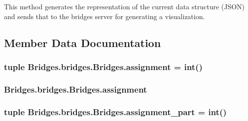 This method generates the representation of the current data structure (J\+S\+O\+N) and sends that to the bridges server for generating a visualization. 



\subsection{Member Data Documentation}
\hypertarget{class_bridges_1_1bridges_1_1_bridges_a2532355e121918d9c30c4fb19161e92e}{}
\subsubsection[{assignment}]{\setlength{\rightskip}{0pt plus 5cm}tuple Bridges.\+bridges.\+Bridges.\+assignment = int()\hspace{0.3cm}{\ttfamily [static]}}\label{class_bridges_1_1bridges_1_1_bridges_a2532355e121918d9c30c4fb19161e92e}
\hypertarget{class_bridges_1_1bridges_1_1_bridges_a66e278ddefd9a2c94c01eb0fc9bbc568}{}
\subsubsection[{assignment}]{\setlength{\rightskip}{0pt plus 5cm}Bridges.\+bridges.\+Bridges.\+assignment}\label{class_bridges_1_1bridges_1_1_bridges_a66e278ddefd9a2c94c01eb0fc9bbc568}
\hypertarget{class_bridges_1_1bridges_1_1_bridges_a16beecb895f3b4814ac213e81394a155}{}
\subsubsection[{assignment\+\_\+part}]{\setlength{\rightskip}{0pt plus 5cm}tuple Bridges.\+bridges.\+Bridges.\+assignment\+\_\+part = int()\hspace{0.3cm}{\ttfamily [static]}}\label{class_bridges_1_1bridges_1_1_bridges_a16beecb895f3b4814ac213e81394a155}
\hypertarget{class_bridges_1_1bridges_1_1_bridges_aab0a68541bf63b6c234c50514f1cbe80}{}
